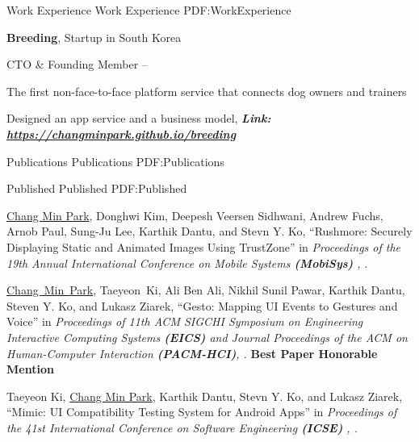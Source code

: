 \documentclass[letterpaper,MMMyyyy,nonstopmode]{simpleresumecv}
\begin{document}
\begin{Body}
\vspace{-0.7ex}
\Section
{Work Experience}
{Work Experience}
{PDF:WorkExperience}

\Entry
\textbf{Breeding}, Startup in South Korea

\Gap
\BulletItem
CTO \& Founding Member
\hfill
{} --

\Gap
\BulletItem
The first non-face-to-face platform service that connects dog owners and trainers
\hfill

\Gap
\BulletItem
Designed an app service and a business model, 
\textbf{\textit{Link: \href{https://changminpark.github.io/breeding}
{https://changminpark.github.io/breeding}}}




\vspace{-0.5ex}
\Section
{Publications}
{Publications}
{PDF:Publications}


\SubSection
{Published}
{Published}
{PDF:Published}

\begingroup
\renewcommand{\MaxNumberedItem}{[88]}

\Gap
\NumberedItem{[1]}
{\underline{Chang Min Park}, Donghwi Kim, Deepesh Veersen Sidhwani, Andrew Fuchs, Arnob Paul,
Sung-Ju Lee, Karthik Dantu, and Stevn Y. Ko,
``Rushmore: Securely Displaying Static and Animated Images Using TrustZone'' in
\textit{Proceedings of the 19th Annual International Conference on Mobile Systems \textbf{(MobiSys)}
, }.}


\Gap
\vspace{0.5ex}
\NumberedItem{[2]} 
\underline{Chang~Min~Park}, Taeyeon~Ki, Ali Ben Ali, 
Nikhil Sunil Pawar, Karthik Dantu, Steven Y. Ko, and Lukasz Ziarek, 
``Gesto: Mapping UI Events to Gestures and Voice'' in
\textit{Proceedings of 11th ACM SIGCHI Symposium on Engineering Interactive Computing Systems \textbf{(EICS)}
and \textit{Journal Proceedings of the ACM on Human-Computer Interaction \textbf{(PACM-HCI)}}, .}
\linebreak\textbf{Best Paper Honorable Mention}

\Gap
\vspace{0.5ex}
\NumberedItem{[3]}
Taeyeon Ki, \underline{Chang Min Park}, Karthik Dantu, Stevn Y. Ko, and Lukasz Ziarek, 
``Mimic: UI Compatibility Testing System for Android Apps'' in
\textit{Proceedings of the 41st International Conference on Software Engineering \textbf{(ICSE)}
, .}


\end{Body}
\end{document}

